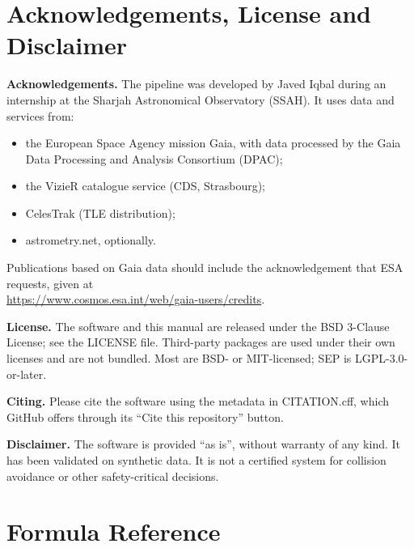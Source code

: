\documentclass[11pt,a4paper]{article}
\newcommand{\docauthor}{Javed Iqbal}
\newcommand{\docorg}{Sharjah Astronomical Observatory (SSAH)}
\newcommand{\doclicense}{BSD 3-Clause License}
\newcommand{\brkus}{\textunderscore\allowbreak}
\newcommand{\code}[1]{{\ttfamily\let\_\brkus #1}}
\begin{document}
\section{Acknowledgements, License and Disclaimer}

\textbf{Acknowledgements.} The pipeline was developed by \docauthor{} during an internship at the
\docorg. It uses data and services from:
\begin{itemize}
\item the European Space Agency mission Gaia, with data processed by the Gaia Data Processing and
  Analysis Consortium (DPAC);
\item the VizieR catalogue service (CDS, Strasbourg);
\item CelesTrak (TLE distribution);
\item astrometry.net, optionally.
\end{itemize}
Publications based on Gaia data should include the acknowledgement that ESA requests, given at\\
{\small\url{https://www.cosmos.esa.int/web/gaia-users/credits}}.

\textbf{License.} The software and this manual are released under the \doclicense{}; see the
\code{LICENSE} file. Third-party packages are used under their own licenses and are not bundled.
Most are BSD- or MIT-licensed; SEP is LGPL-3.0-or-later.

\textbf{Citing.} Please cite the software using the metadata in \code{CITATION.cff}, which
GitHub offers through its ``Cite this repository'' button.

\textbf{Disclaimer.} The software is provided ``as is'', without warranty of any kind. It has been
validated on synthetic data. It is not a certified system for collision avoidance or other
safety-critical decisions.

\clearpage
\appendix
\section{Formula Reference}
\end{document}
